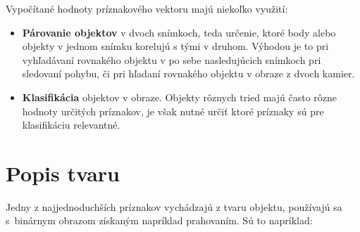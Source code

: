     Vypočítané hodnoty príznakového vektoru majú niekoľko využití:

    \begin{itemize}
        \item \textbf{Párovanie objektov} v dvoch snímkoch, teda určenie, ktoré body alebo objekty v jednom snímku korelujú s tými v druhom. Výhodou je to pri vyhľadávaní rovnakého objektu v po sebe nasledujúcich snímkoch pri sledovaní pohybu, či pri hľadaní rovnakého objektu v obraze z dvoch kamier.
        \item \textbf{Klasifikácia} objektov v obraze. Objekty rôznych tried majú často rôzne hodnoty určitých príznakov, je však nutné určiť ktoré príznaky sú pre klasifikáciu relevantné.
    \end{itemize}

    \section{Popis tvaru}

        Jedny z najjednoduchších príznakov vychádzajú z tvaru objektu, používajú sa s~binárnym obrazom získaným napríklad prahovaním. \cite{Morse1998/2} Sú to napríklad:

